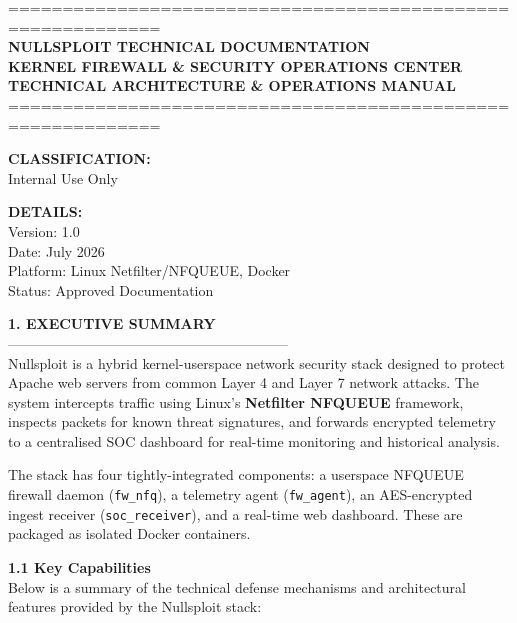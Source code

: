 \documentclass[12pt,a4paper]{article}
\begin{document}
\raggedright

============================================================\\
\textbf{NULLSPLOIT TECHNICAL DOCUMENTATION}\\
\textbf{KERNEL FIREWALL \& SECURITY OPERATIONS CENTER}\\
\textbf{TECHNICAL ARCHITECTURE \& OPERATIONS MANUAL}\\
============================================================

\textbf{CLASSIFICATION:}\\
Internal Use Only

\textbf{DETAILS:}\\
Version: 1.0\\
Date: July 2026\\
Platform: Linux Netfilter/NFQUEUE, Docker\\
Status: Approved Documentation

\vspace{1.5em}
\textbf{1. EXECUTIVE SUMMARY}\\
------------------------------------------------------------\\
Nullsploit is a hybrid kernel-userspace network security stack designed to protect Apache web servers from common Layer 4 and Layer 7 network attacks. The system intercepts traffic using Linux's \textbf{Netfilter NFQUEUE} framework, inspects packets for known threat signatures, and forwards encrypted telemetry to a centralised SOC dashboard for real-time monitoring and historical analysis.

The stack has four tightly-integrated components: a userspace NFQUEUE firewall daemon (\texttt{fw\_nfq}), a telemetry agent (\texttt{fw\_agent}), an AES-encrypted ingest receiver (\texttt{soc\_receiver}), and a real-time web dashboard. These are packaged as isolated Docker containers.

\textbf{1.1 Key Capabilities}\\
Below is a summary of the technical defense mechanisms and architectural features provided by the Nullsploit stack:
\end{document}
